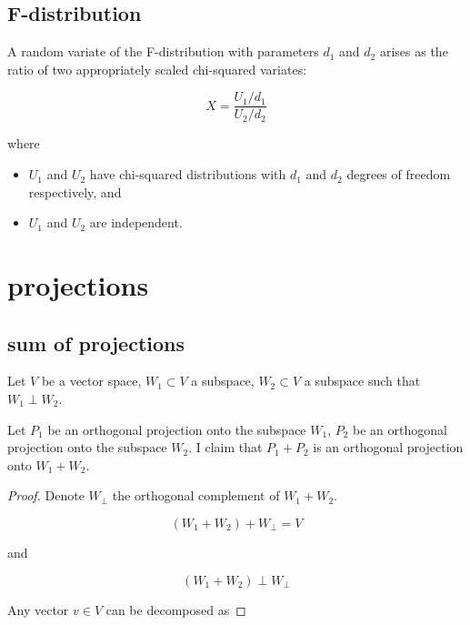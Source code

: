 \documentclass{article}
\begin{document}
\begin{appendices}
\subsection{F-distribution} \label{app:F_distribution}

A random variate of the F-distribution with parameters $d_1$ and $d_2$ arises as the ratio of two appropriately scaled chi-squared variates:

\begin{equation}
    X = \frac{U_1 / d_1}{U_2 / d_2}
\end{equation}

where

\begin{itemize}
    \item $U_{1}$ and $U_{2}$ have chi-squared distributions with $d_{1}$ and $d_{2}$ degrees of freedom respectively, and
    \item $U_{1}$ and $U_{2}$ are independent.
\end{itemize}

\section{projections}

\subsection{sum of projections}

Let $V$ be a vector space, $W_1 \subset V$ a subspace, $W_2 \subset V$ a subspace such that $W_1 \perp W_2$.

Let $P_1$ be an orthogonal projection onto the subspace $W_1$, $P_2$ be an orthogonal projection onto the subspace $W_2$. I claim that $P_1 + P_2$ is an orthogonal projection onto $W_1 + W_2$.

\begin{proof}

Denote $W_{\perp}$ the orthogonal complement of $W_1+W_2$.

\begin{equation}
    (W_1 + W_2) + W_{\perp} = V
\end{equation}

and

\begin{equation}
    (W_1 + W_2) \perp W_{\perp}
\end{equation}

Any vector $v \in V$ can be decomposed as


\end{proof}
\end{appendices}
\end{document}
